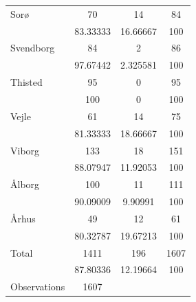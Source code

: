 {\begin{tabular}{l*{3}{c}}
Sorø                &          70&          14&          84\\
                    &    83.33333&    16.66667&         100\\
Svendborg           &          84&           2&          86\\
                    &    97.67442&    2.325581&         100\\
Thisted             &          95&           0&          95\\
                    &         100&           0&         100\\
Vejle               &          61&          14&          75\\
                    &    81.33333&    18.66667&         100\\
Viborg              &         133&          18&         151\\
                    &    88.07947&    11.92053&         100\\
Ålborg              &         100&          11&         111\\
                    &    90.09009&     9.90991&         100\\
Århus               &          49&          12&          61\\
                    &    80.32787&    19.67213&         100\\
Total               &        1411&         196&        1607\\
                    &    87.80336&    12.19664&         100\\
\midrule
Observations        &        1607&            &            \\
\bottomrule
\end{tabular}
}
